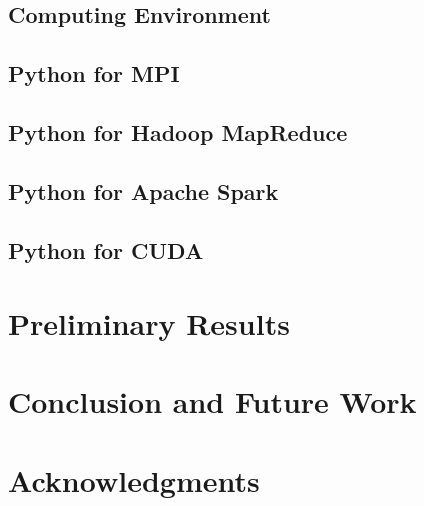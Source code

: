 \documentclass[10pt, conference, compsocconf]{IEEEtran}
\begin{document}
\subsection{Computing Environment}


\subsection{Python for MPI}


\subsection{Python for Hadoop MapReduce}


\subsection{Python for Apache Spark}


\subsection{Python for CUDA}


\section{Preliminary Results}
\label{sec:prelim}


\section{Conclusion and Future Work}
\label{sec:conclusion}


\section{Acknowledgments}


\end{document}
